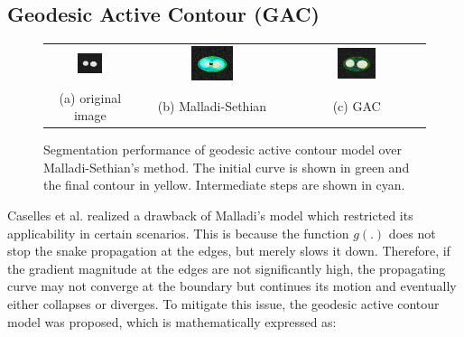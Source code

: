 \subsection{Geodesic Active Contour (GAC)}
\begin{figure}[t]
\centering
\renewcommand{\tabcolsep}{0.05cm}
\begin{tabular}{@{}ccc@{}}
\includegraphics[width=0.3\textwidth]{images/demo/GAC/blobs_gaussian}	&
\includegraphics[width=0.3\textwidth]{images/demo/GAC/malladi_bad}	&
\includegraphics[width=0.3\textwidth]{images/demo/GAC/GAC_good}	\\
(a) original image & (b) Malladi-Sethian  & (c) GAC
\end{tabular}
\caption[GAC vs Malladi-Sethian model]{Segmentation performance of geodesic active contour model over Malladi-Sethian's method. The initial curve is shown in green and the final contour in yellow. Intermediate steps are shown in cyan.}
\label{fig:GACvsMalladi}
\end{figure}
Caselles et al.\cite{caselles_GAC} realized a drawback of Malladi's model which restricted its applicability in certain scenarios. This is because the function $g(.)$ does not stop the snake propagation at the edges, but merely slows it down. Therefore, if the gradient magnitude at the edges are not significantly high, the propagating curve may not converge at the boundary but continues its motion and eventually either collapses or diverges. To mitigate this issue, the geodesic active contour model was proposed, which is mathematically expressed as:
